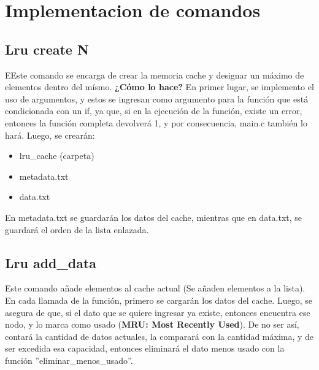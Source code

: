 \section{Implementacion de comandos}
    \subsection{Lru create N}
    EEste comando se encarga de crear la memoria cache y designar un máximo de elementos dentro del mísmo. 
    \textbf{¿Cómo lo hace?} En primer lugar, se implemento el uso de argumentos, y estos se ingresan como argumento 
    para la función que está condicionada con un if, ya que, si en la ejecución de la función, existe un error, 
    entonces la función completa devolverá 1, y por consecuencia, main.c también lo hará. Luego, se crearán:
    \begin{itemize}
        \item lru\_cache (carpeta)
        \item metadata.txt
        \item data.txt
    \end{itemize}
    En metadata.txt se guardarán los datos del cache, mientras que en data.txt, se guardará el orden de la lista enlazada.
    \subsection{Lru add\_data} %
    Este comando añade elementos al cache actual (Se añaden elementos a la lista). En cada llamada de la función, primero se cargarán los datos del cache. 
    Luego, se asegura de que, si el dato que se quiere ingresar ya existe, entonces encuentra ese nodo, y lo marca como usado (\textbf{MRU: Most Recently Used}). 
    De no ser así, contará la cantidad de datos actuales, la comparará con la cantidad máxima, y de ser excedida esa capacidad, entonces eliminará el dato menos usado 
    con la función ''eliminar\_menos\_usado''.
